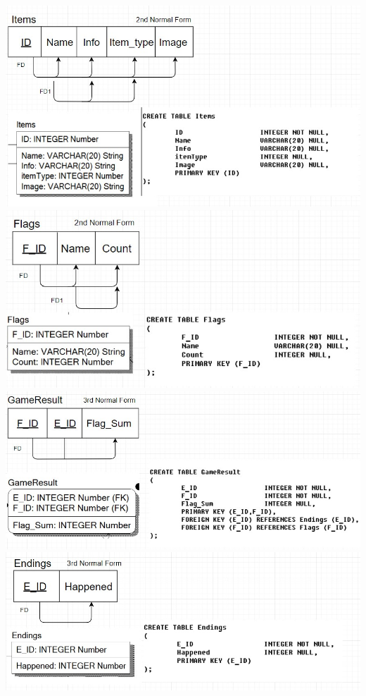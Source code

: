 \documentclass[12pt,a4paper]{article}
\begin{document}
\begin{center}
\includegraphics[scale=0.8]{images/FD/FD4.jpg}
\includegraphics[scale=0.8]{images/FD/FD5.jpg}    
\includegraphics[scale=0.8]{images/FD/FD6.jpg} 
\includegraphics[scale=0.7]{images/FD/FD7.jpg}
\end{center}
\end{document}
